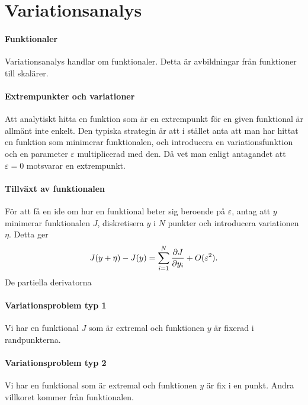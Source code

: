 \section{Variationsanalys}

\paragraph{Funktionaler}
Variationsanalys handlar om funktionaler. Detta är avbildningar från funktioner till skalärer.

\paragraph{Extrempunkter och variationer}
Att analytiskt hitta en funktion som är en extrempunkt för en given funktional är allmänt inte enkelt. Den typiska strategin är att i stället anta att man har hittat en funktion som minimerar funktionalen, och introducera en variationsfunktion och en parameter $\varepsilon$ multiplicerad med den. Då vet man enligt antagandet att $\varepsilon = 0$ motsvarar en extrempunkt.

\paragraph{Tillväxt av funktionalen}
För att få en ide om hur en funktional beter sig beroende på $\varepsilon$, antag att $y$ minimerar funktionalen $J$, diskretisera $y$ i $N$ punkter och introducera variationen $\eta$. Detta ger
\begin{align*}
	J(y + \eta) - J(y) = \sum\limits_{i = 1}^{N}\pdv{J}{y_{i}} + O(\varepsilon^{2}).
\end{align*}
De partiella derivatorna

\paragraph{Variationsproblem typ 1}
Vi har en funktional $J$ som är extremal och funktionen $y$ är fixerad i randpunkterna.

\paragraph{Variationsproblem typ 2}
Vi har en funktional som är extremal och funktionen $y$ är fix i en punkt. Andra villkoret kommer från funktionalen.
